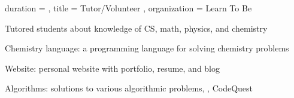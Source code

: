 \documentclass[inter=true, sidebar-width=2.25in, primary=slate]{clean-resume}
\begin{document}
\begin{main}
\begin{experience}
    \end{experience}
    
    
    \begin{experience}
      {
        duration = {  },
        title = { Tutor/Volunteer },
        organization = { Learn To Be }
      }
      \item Tutored students about knowledge of CS, math, physics, and   ch\-em\-istry
    \end{experience}
    
    
    
    
    \begin{lst}
      \item Chemistry language: a programming language for solving chemistry   problems
      \item Website: personal website with portfolio, resume, and blog
      \item Algorithms: solutions to various algorithmic problems, \eg, CodeQuest
    \end{lst}
    

\end{main}
\end{document}
